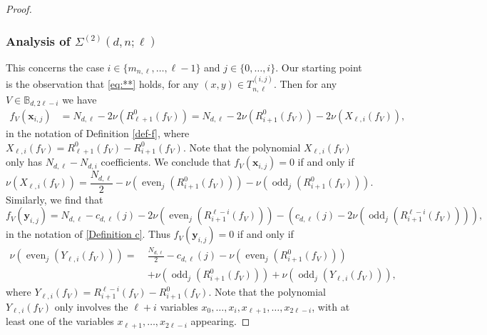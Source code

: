 \documentclass[11pt, reqno]{amsart}
\numberwithin{equation}{section}
\newcommand{\xx}{\mathbf{x}}
\newcommand{\yy}{\mathbf{y}}
\DeclareMathOperator{\even}{even}
\DeclareMathOperator{\odd}{odd}
\begin{document}
\begin{proof}
\subsubsection*{Analysis of $\Sigma^{(2)}(d,n;\ell)$}

This concerns the case $i\in \{m_{n,\ell},\dots,\ell-1\}$ and $j\in \{0,\dots,i\}$.
Our starting point is the observation that \eqref{eq:**} holds, 
for  any $(x,y)\in T_{n,\ell}^{(i,j)}$.
Then for any 
$V\in 
 \mathbb{B}_{d,2\ell-i}$ we have 
 \begin{align*}
f_V(\xx_{i,j})
&=N_{d,\ell}-2\nu(R_{\ell+1}^0(f_V))
=
N_{d,\ell}-2\nu(R_{i+1}^0(f_V))-2\nu(X_{\ell,i}(f_V)),
\end{align*}
in the notation of Definition \ref{def-f}, where
$X_{\ell,i}(f_V)=R_{\ell+1}^0(f_V)-R_{i+1}^0(f_V)$.
Note that the polynomial $X_{\ell,i}(f_V)$ only has $N_{d,\ell}-N_{d,i}$ coefficients. 
We conclude that $f_V(\xx_{i,j})=0$ if and only if 
\begin{equation}\label{eq:sun}
\nu(X_{\ell,i}(f_V))=\frac{N_{d,\ell}}{2}-
\nu\left( 
\even_j\left(R_{i+1}^0(f_V)\right)\right)
-\nu\left( 
\odd_j\left(R_{i+1}^0(f_V)\right)\right).
\end{equation}
Similarly, we find that 
 $$
f_V(\yy_{i,j})=N_{d,\ell}-c_{d,\ell}(j)-
2\nu\left( 
\even_j\left(R_{i+1}^{\ell-i}(f_V)\right)\right)
-\left(c_{d,\ell}(j)-
2\nu\left( 
\odd_j\left(R_{i+1}^{\ell-i}(f_V)\right)\right)\right),
$$
in the notation of \eqref{Definition c}.
Thus   $f_V(\yy_{i,j})=0$ if and only if 
\begin{equation}\label{eq:moon}
\begin{split}
\nu\left(\even_j\left( Y_{\ell,i}(f_V)\right)\right)
=~&\frac{N_{d,\ell}}{2}-
c_{d,\ell}(j)-
\nu\left( 
\even_j\left(R_{i+1}^0(f_V)\right)\right)\\
&+\nu\left( 
\odd_j\left(R_{i+1}^0(f_V)\right)\right)
+\nu\left( 
\odd_j\left(Y_{\ell,i}(f_V)\right)\right),
\end{split}
\end{equation}
where 
$Y_{\ell,i}(f_V)=R_{i+1}^{\ell-i}(f_V)-R_{i+1}^0(f_V)$.
Note that the polynomial $Y_{\ell,i}(f_V)$ only involves the 
$\ell+i$
variables
$x_{0},\dots,x_{i}, x_{\ell+1},\dots,x_{2\ell-i}$,
with at least one of the variables $x_{\ell+1},\dots,x_{2\ell-i}$ appearing.


\end{proof}
\end{document}
